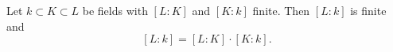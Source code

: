 Let $k \subset K \subset L$ be fields with $[L:K]$ and $[K:k]$ finite. Then $[L:k]$ is finite and
$$[L:k] = [L:K] \cdot [K:k].$$
